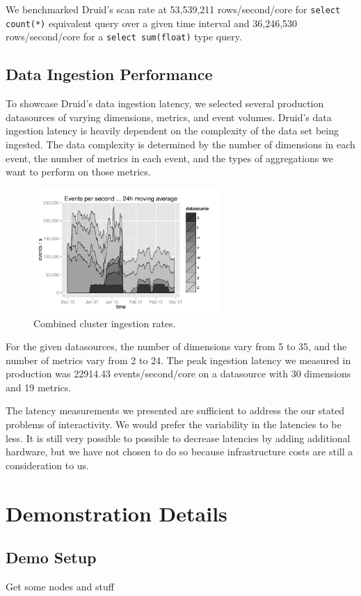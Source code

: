 \documentclass{vldb}
\begin{document}
We benchmarked Druid's scan rate at 53,539,211 rows/second/core for
\texttt{select count(*)} equivalent query over a given time interval and
36,246,530 rows/second/core for a \texttt{select sum(float)} type query.

\subsection{Data Ingestion Performance}
To showcase Druid's data ingestion latency, we selected several production
datasources of varying dimensions, metrics, and event volumes. Druid's data
ingestion latency is heavily dependent on the complexity of the data set being
ingested. The data complexity is determined by the number of dimensions in each
event, the number of metrics in each event, and the types of aggregations we
want to perform on those metrics. 

\begin{figure}
\centering
\includegraphics[width = 2.8in]{ingestion_rate}
\caption{Combined cluster ingestion rates.}
\label{fig:ingestion_rate}
\end{figure}

For the given datasources, the number of dimensions vary from 5 to 35, and the
number of metrics vary from 2 to 24. The peak ingestion latency we measured in
production was 22914.43 events/second/core on a datasource with 30 dimensions
and 19 metrics.

The latency measurements we presented are sufficient to address the our stated
problems of interactivity. We would prefer the variability in the latencies to
be less. It is still very possible to possible to decrease latencies by adding
additional hardware, but we have not chosen to do so because infrastructure
costs are still a consideration to us.

\section{Demonstration Details}
\subsection{Demo Setup}
Get some nodes and stuff
\end{document}
